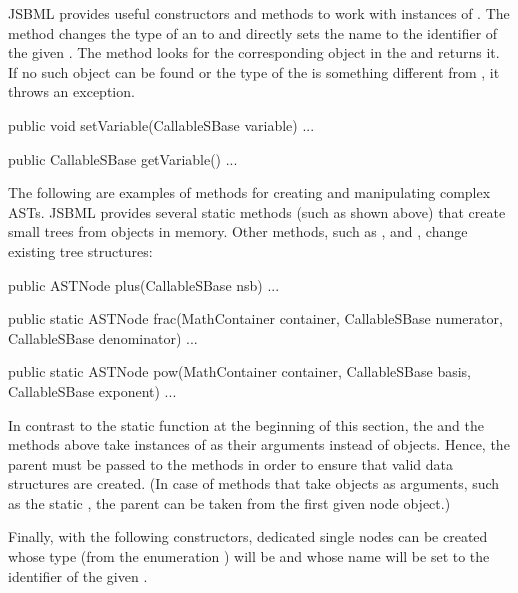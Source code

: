 JSBML provides useful constructors and methods to work with instances of
\CallableSBase.  The  method changes the type of an \ASTNode to
\ASTTypeName and directly sets the name to the identifier of the given
\CallableSBase.  The  method looks for the corresponding object in
the \Model and returns it. If no such object can be found or the type of the
\ASTNode is something different from \ASTTypeName, it throws an exception.

\begin{example}[title={Getter and setter for \CallableSBase.}]
public void setVariable(CallableSBase variable) { ... }

public CallableSBase getVariable() { ... }
\end{example}

The following are examples of methods for creating and manipulating complex
ASTs.  JSBML provides several static methods (such as  shown above)
that create small trees from objects in memory.  Other methods, such as
,  and , change existing tree structures:

\begin{example}[title={Some examples for convenience methods, some of
    them static methods, provided by JSBML for working with \ASTNode{}s.}]
public ASTNode plus(CallableSBase nsb) { ... }

public static ASTNode frac(MathContainer container,
      CallableSBase numerator, CallableSBase denominator) { ... }

public static ASTNode pow(MathContainer container,
      CallableSBase basis, CallableSBase exponent) { ... }
\end{example}

In contrast to the static  function at the beginning of
this section, the  and the  methods above take instances
of \CallableSBase as their arguments instead of \ASTNode objects. Hence, the
parent \MathContainer must be passed to the methods in order to ensure that
valid data structures are created. (In case of methods that take \ASTNode
objects as arguments, such as the static , the parent
\MathContainer can be taken from the first given node object.)

Finally, with the following \ASTNode constructors, dedicated single nodes can
be created whose type (from the enumeration \ASTType) will be  and
whose name will be set to the identifier of the given \CallableSBase.

